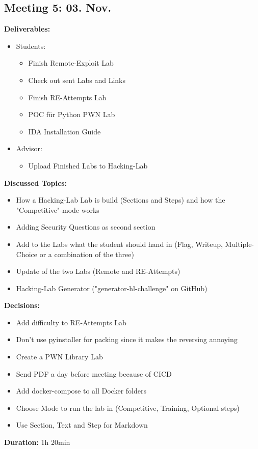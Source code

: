 \subsection*{Meeting 5: 03. Nov.}
\textbf{Deliverables:}
\begin{itemize}
    \item Students:
    \begin{itemize}
        \item Finish Remote-Exploit Lab
        \item Check out sent Labs and Links
        \item Finish RE-Attempts Lab
        \item POC für Python PWN Lab
        \item IDA Installation Guide
    \end{itemize}
    \item Advisor:
    \begin{itemize}
        \item Upload Finished Labs to Hacking-Lab
    \end{itemize}
\end{itemize} 
\textbf{Discussed Topics:}
\begin{itemize}
    \item How a Hacking-Lab Lab is build (Sections and Steps) and how the "Compe\-titive"-mode works
    \item Adding Security Questions as second section
    \item Add to the Labs what the student should hand in (Flag, Writeup, Multiple-Choice or a combination of the three)
    \item Update of the two Labs (Remote and RE-Attempts)
    \item Hacking-Lab Generator ("generator-hl-challenge" on GitHub)
\end{itemize}
\textbf{Decisions:}
\begin{itemize}
    \item Add difficulty to RE-Attempts Lab
    \item Don't use pyinstaller for packing since it makes the reversing annoying
    \item Create a PWN Library Lab
    \item Send PDF a day before meeting because of CICD
    \item Add docker-compose to all Docker folders
    \item Choose Mode to run the lab in (Competitive, Training, Optional steps)
    \item Use Section, Text and Step for Markdown
\end{itemize}
\textbf{Duration:} 1h 20min
